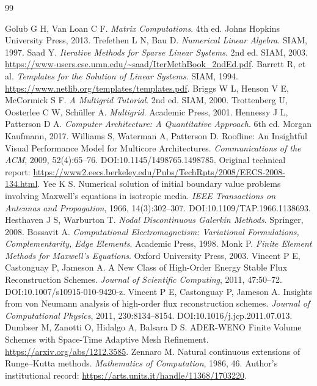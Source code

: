 \begin{thebibliography}{99}
 Golub G H, Van Loan C F. \emph{Matrix Computations}. 4th ed. Johns Hopkins University Press, 2013.
 Trefethen L N, Bau D. \emph{Numerical Linear Algebra}. SIAM, 1997.
 Saad Y. \emph{Iterative Methods for Sparse Linear Systems}. 2nd ed. SIAM, 2003. \url{https://www-users.cse.umn.edu/~saad/IterMethBook_2ndEd.pdf}.
 Barrett R, et al. \emph{Templates for the Solution of Linear Systems}. SIAM, 1994. \url{https://www.netlib.org/templates/templates.pdf}.
 Briggs W L, Henson V E, McCormick S F. \emph{A Multigrid Tutorial}. 2nd ed. SIAM, 2000.
 Trottenberg U, Oosterlee C W, Schüller A. \emph{Multigrid}. Academic Press, 2001.
 Hennessy J L, Patterson D A. \emph{Computer Architecture: A Quantitative Approach}. 6th ed. Morgan Kaufmann, 2017.
 Williams S, Waterman A, Patterson D. Roofline: An Insightful Visual Performance Model for Multicore Architectures. \emph{Communications of the ACM}, 2009, 52(4):65--76. DOI:10.1145/1498765.1498785. Original technical report: \url{https://www2.eecs.berkeley.edu/Pubs/TechRpts/2008/EECS-2008-134.html}.
 Yee K S. Numerical solution of initial boundary value problems involving Maxwell's equations in isotropic media. \emph{IEEE Transactions on Antennas and Propagation}, 1966, 14(3):302--307. DOI:10.1109/TAP.1966.1138693.
 Hesthaven J S, Warburton T. \emph{Nodal Discontinuous Galerkin Methods}. Springer, 2008.
 Bossavit A. \emph{Computational Electromagnetism: Variational Formulations, Complementarity, Edge Elements}. Academic Press, 1998.
 Monk P. \emph{Finite Element Methods for Maxwell's Equations}. Oxford University Press, 2003.
 Vincent P E, Castonguay P, Jameson A. A New Class of High-Order Energy Stable Flux Reconstruction Schemes. \emph{Journal of Scientific Computing}, 2011, 47:50--72. DOI:10.1007/s10915-010-9420-z.
 Vincent P E, Castonguay P, Jameson A. Insights from von Neumann analysis of high-order flux reconstruction schemes. \emph{Journal of Computational Physics}, 2011, 230:8134--8154. DOI:10.1016/j.jcp.2011.07.013.
 Dumbser M, Zanotti O, Hidalgo A, Balsara D S. ADER-WENO Finite Volume Schemes with Space-Time Adaptive Mesh Refinement. \url{https://arxiv.org/abs/1212.3585}.
 Zennaro M. Natural continuous extensions of Runge--Kutta methods. \emph{Mathematics of Computation}, 1986, 46. Author's institutional record: \url{https://arts.units.it/handle/11368/1703220}.

\end{thebibliography}

